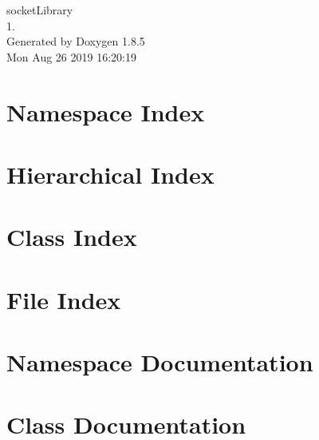 \documentclass[twoside]{book}
\newcommand{\clearemptydoublepage}{%
  \newpage{\pagestyle{empty}\cleardoublepage}%
}
\begin{document}
\hypersetup{pageanchor=false}
\begin{titlepage}
\vspace*{7cm}
\begin{center}%
{\Large socket\-Library \\[1ex]\large 1. }\\
\vspace*{1cm}
{\large Generated by Doxygen 1.8.5}\\
\vspace*{0.5cm}
{\small Mon Aug 26 2019 16:20:19}\\
\end{center}
\end{titlepage}
\clearemptydoublepage
\tableofcontents
\clearemptydoublepage
{}
\hypersetup{pageanchor=true}

\chapter{Namespace Index}

\chapter{Hierarchical Index}

\chapter{Class Index}

\chapter{File Index}

\chapter{Namespace Documentation}

\chapter{Class Documentation}



\end{document}
